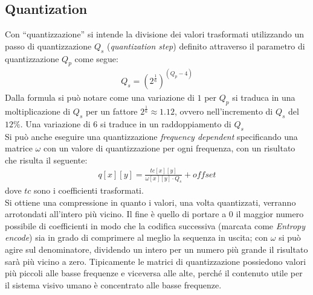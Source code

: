 \subsection{Quantization}
Con ``quantizzazione'' si intende la divisione dei valori trasformati 
utilizzando un passo di quantizzazione $Q_s$ (\emph{quantization step}) definito
 attraverso il parametro di quantizzazione $Q_p$ come segue:
\begin{align*}
Q_s = \left(2^{\frac{1}{6}}\right)^{(Q_p-4)}
\end{align*}
Dalla formula si può notare come una variazione di $1$ per $Q_p$ si traduca in 
una moltiplicazione di $Q_s$ per un fattore $2^{\frac{1}{6}}\approx 1.12$, ovvero 
nell'incremento di $Q_s$ del $12\%$. Una variazione di $6$ si traduce in un 
raddoppiamento di $Q_s$ \\
Si può anche eseguire una quantizzazione \emph{frequency dependent} specificando
 una matrice $\omega$ con un valore di quantizzazione per ogni frequenza, con 
 un 
risultato che risulta il seguente:
\begin{align*}
q[x][y] = \frac{tc[x][y]}{\omega[x][y]\cdot Q_s}+offset
\end{align*}
dove $tc$ sono i coefficienti trasformati. \\
Si ottiene una compressione in quanto i valori, una volta quantizzati, verranno 
arrotondati all'intero più vicino. Il fine è quello di portare a 0 il maggior 
numero possibile di coefficienti in modo che la codifica successiva (marcata 
come \emph{Entropy encode}) sia in grado di comprimere al meglio la sequenza in 
uscita; con $\omega$ si può agire sul denominatore, dividendo un intero per un 
numero più grande il risultato sarà più 
vicino a zero. Tipicamente le matrici di quantizzazione possiedono valori più 
piccoli alle basse frequenze e viceversa alle alte, perché il contenuto utile 
per il sistema visivo umano è concentrato alle basse frequenze.


